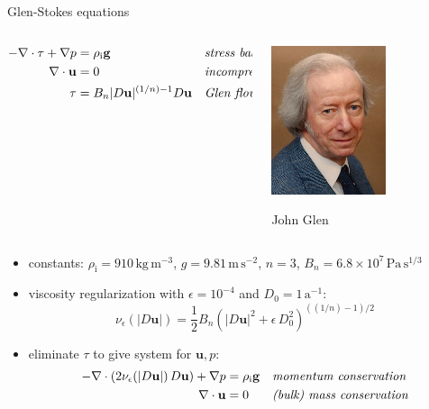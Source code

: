 \documentclass[10pt,hyperref,dvipsnames]{beamer}
\newcommand{\bg}{\mathbf{g}}
\newcommand{\bu}{\mathbf{u}}
\newcommand{\Div}{\nabla\cdot}
\newcommand{\eps}{\epsilon}
\newcommand{\rhoi}{\rho_{\text{i}}}
\begin{document}
\begin{frame}{Glen-Stokes equations}

\begin{columns}
\begin{column}{0.8\textwidth}
\begin{align*}
- \nabla \cdot \tau + \nabla p &= \rhoi \bg &&\text{\emph{stress balance}} \\
\nabla \cdot \bu &= 0 &&\text{\emph{incompressibility}} \\
\tau &= B_n |D\bu|^{(1/n) - 1} D\bu  &&\text{\emph{Glen flow law}}
\end{align*}
\end{column}

\begin{column}{0.2\textwidth}

\vspace{5mm}
\hfill \includegraphics[width=0.6\textwidth]{figs/people/jglen.png}

\hfill {\tiny John Glen}
\end{column}
\end{columns}

\bigskip
\begin{itemize}
\item constants: {\small $\rhoi=910 \,\text{kg}\,\text{m}^{-3}$, $g=9.81\,\text{m}\,\text{s}^{-2}$, $n=3$, $B_n=6.8\times 10^7\,\text{Pa}\,\text{s}^{1/3}$}
\item viscosity regularization with $\eps = 10^{-4}$ and $D_0 = 1\,\text{a}^{-1}$:
\begin{equation*}
\nu_\eps(|D\bu|) = \frac{1}{2} B_n \left(|D\bu|^2 + \eps\, D_0^2\right)^{((1/n) - 1)/2}
\end{equation*}
\item eliminate $\tau$ to give system for $\bu,p$:
\begin{align*}
- \nabla \cdot \left(2 \nu_\eps(|D\bu|)\, D\bu\right) + \nabla p &= \rhoi \mathbf{g} && \text{\emph{momentum conservation}} \\
\Div \bu &= 0 && \text{\emph{(bulk) mass conservation}}
\end{align*}
\end{itemize}
\end{frame}
\end{document}
